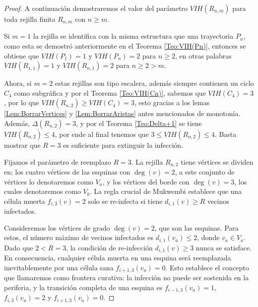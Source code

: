 \documentclass[12pt,titlepage,twoside,openright]{book}
\begin{document}
\begin{proof}
    A continuaci\'on demostraremos el valor del par\'ametro $VIH(R_{n,m})$ para toda rejilla finita $R_{n,m}$ con $n\geq m$.

    Si $m=1$ la rejilla se identifica con la misma estructura que una trayectoria $P_n$, como esta se demostr\'o anteriormente en el Teorema \ref{Teo:VIH(Pn)}, entonces se obtiene que $VIH(P_1)=1$ y $VIH(P_n)=2$ para $n\geq 2$, en otras palabras $VIH(R_{1,1})=1$ y $VIH(R_{n,1})=2$ para $n\geq 2>m$.

    Ahora, si $m=2$ estas rejillas son tipo escalera, adem\'as siempre contienen un ciclo $C_4$ como subgr\'afica y por el Teorema \ref{Teo:VIH(Cn)}, sabemos que $VIH(C_4)=3$, por lo que $VIH(R_{n,2})\geq VIH(C_4)=3$, esto gracias a los lemas \ref{Lem:BorrarVertices} y \ref{Lem:BorrarAristas} antes mencionados de monoton\'ia. Adem\'as, $\Delta(R_{n,2})=3$, y por el Teorema \ref{Teo:Delta+1} se tiene $VIH(R_{n,2})\leq 4$, por ende al final tenemos que $3\leq VIH(R_{n,2})\leq 4$. Basta mostrar que $R=3$ es suficiente para extinguir la infecci\'on.

    Fijamos el par\'ametro de reemplazo $R=3$. La rejilla $R_{n,2}$ tiene v\'ertices se dividen en; los cuatro v\'ertices de las esquinas con $\deg(v)=2$, a este conjunto de v\'ertices lo denotaremos como $V_a$, y los v\'ertices del borde con $\deg(v)=3$, los cuales denotaremos como $V_b$. La regla crucial de Mukwembi establece que una c\'elula muerta $f_{i,3}(v)=2$ solo se re-infecta si tiene $d_{i,1}(v) \ge R$ vecinos infectados.

    Consideremos los v\'ertices de grado $\deg(v)=2$, que son las esquinas. Para estos, el n\'umero m\'aximo de vecinos infectados es $d_{i,1}(v_a) \le 2$, donde $v_a \in V_a$. Dado que $2 < R=3$, la condici\'on de re-infecci\'on $d_{i,1}(v) \ge 3$ nunca se satisface. En consecuencia, cualquier c\'elula muerta en una esquina ser\'a reemplazada inevitablemente por una c\'elula sana $f_{i+1,3}(v_a)=0$. Esto establece el concepto que llamaremos como frontera curativa: la infecci\'on no puede ser sostenida en la periferia, y la transici\'on completa de una esquina es $f_{i-1,3}(v_a)=1$, $f_{i,3}(v_a)=2$ y $f_{i+1,3}(v_a)=0$.


\end{proof}
\end{document}

